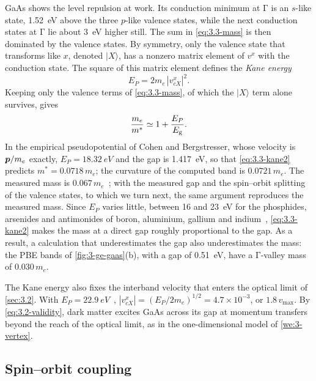 GaAs shows the level repulsion at work. Its conduction minimum at $\mathrm{\Gamma}$ is an $s$-like state, \SI{1.52}{eV} above the three $p$-like valence states, while the next conduction states at $\mathrm{\Gamma}$ lie about \SI{3}{eV} higher still. The sum in \cref{eq:3.3-mass} is then dominated by the valence states. By symmetry, only the valence state that transforms like $x$, denoted $|X\rangle$, has a nonzero matrix element of $v^x$ with the conduction state. The square of this matrix element defines the \emph{Kane energy}
\begin{equation*}
  E_P = 2m_e\,|v^x_{cX}|^2 .
\end{equation*}
Keeping only the valence terms of \cref{eq:3.3-mass}, of which the $|X\rangle$ term alone survives, gives
\begin{equation}
  \frac{m_e}{m^*} \simeq 1 + \frac{E_P}{E_{\mathrm{g}}} .
  \label{eq:3.3-kane2}
\end{equation}
In the empirical pseudopotential of Cohen and Bergstresser, whose velocity is $\bm{p}/m_e$ exactly, $E_P = \SI{18.32}{eV}$ and the gap is \SI{1.417}{eV}, so that \cref{eq:3.3-kane2} predicts $m^* = 0.0718\,m_e$; the curvature of the computed band is $0.0721\,m_e$. The measured mass is $0.067\,m_e$~\cite{vurgaftman2001band}; with the measured gap and the spin--orbit splitting of the valence states, to which we turn next, the same argument reproduces the measured mass. Since $E_P$ varies little, between 16 and \SI{23}{eV} for the phosphides, arsenides and antimonides of boron, aluminium, gallium and indium~\cite[Table~VIII]{gawarecki2022invariant}, \cref{eq:3.3-kane2} makes the mass at a direct gap roughly proportional to the gap. As a result, a calculation that underestimates the gap also underestimates the mass: the PBE bands of \cref{fig:3-ge-gaas}(b), with a gap of \SI{0.51}{eV}, have a $\mathrm{\Gamma}$-valley mass of $0.030\,m_e$.

The Kane energy also fixes the interband velocity that enters the optical limit of \cref{sec:3.2}. With $E_P = \SI{22.9}{eV}$~\cite[Table~VIII]{gawarecki2022invariant}, $|v^x_{cX}| = (E_P/2m_e)^{1/2} = 4.7\times10^{-3}$, or $1.8\,v_{\mathrm{max}}$. By \cref{eq:3.2-validity}, dark matter excites GaAs across its gap at momentum transfers beyond the reach of the optical limit, as in the one-dimensional model of \cref{we:3-vertex}.

\subsection{Spin--orbit coupling}


